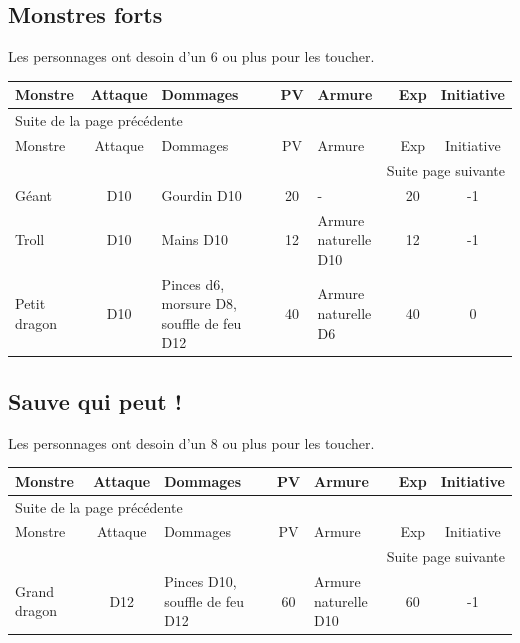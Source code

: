 \documentclass[a4paper, 11pt, twoside]{article}
\begin{document}
\subsection{Monstres forts}
\label{sec:org9535e11}

Les personnages ont desoin d'un 6 ou plus pour les toucher.

\begin{longtable}{p{3cm}|c|p{3.5cm}|c|p{3.8cm}|c|c}
Monstre & Attaque & Dommages & PV & Armure & Exp & Initiative\\
\hline
\endfirsthead
\multicolumn{7}{l}{Suite de la page précédente} \\
\hline

Monstre & Attaque & Dommages & PV & Armure & Exp & Initiative \\

\hline
\endhead
\hline\multicolumn{7}{r}{Suite page suivante} \\
\endfoot
\endlastfoot
\hline
Géant & D10 & Gourdin D10 & 20 & - & 20 & -1\\
\hline
Troll & D10 & Mains D10 & 12 & Armure naturelle D10 & 12 & -1\\
\hline
Petit dragon & D10 & Pinces d6, morsure D8, souffle de feu D12 & 40 & Armure naturelle D6 & 40 & 0\\
\end{longtable}

\subsection{Sauve qui peut !}
\label{sec:org0764337}

Les personnages ont desoin d'un 8 ou plus pour les toucher.

\begin{longtable}{l|c|p{3.5cm}|c|p{3.8cm}|c|c}
Monstre & Attaque & Dommages & PV & Armure & Exp & Initiative\\
\hline
\endfirsthead
\multicolumn{7}{l}{Suite de la page précédente} \\
\hline

Monstre & Attaque & Dommages & PV & Armure & Exp & Initiative \\

\hline
\endhead
\hline\multicolumn{7}{r}{Suite page suivante} \\
\endfoot
\endlastfoot
\hline
Grand dragon & D12 & Pinces D10, souffle de feu D12 & 60 & Armure naturelle D10 & 60 & -1\\
\end{longtable}
\end{document}
